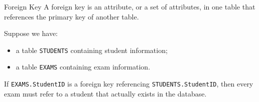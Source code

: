  \begin{defbox}{Foreign Key}
  A foreign key is an attribute, or a set of attributes, in one table that references the primary key of another table.
 \end{defbox}

 \begin{example}
  Suppose we have:
  \begin{itemize}
   \item a table \texttt{STUDENTS} containing student information;
   \item a table \texttt{EXAMS} containing exam information.
  \end{itemize}

  If \texttt{EXAMS.StudentID} is a foreign key referencing \texttt{STUDENTS.StudentID}, then every exam must refer to a student that actually exists in the database.
 \end{example}

 \vs

